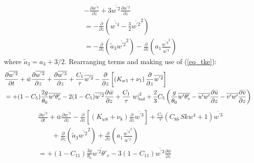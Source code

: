 \documentclass[11pt,fleqn]{article}
\newcommand{\ptlder}[2]{\frac{\partial #1}{\partial #2}}
\begin{document}
%
\begin{equation}
\begin{split}
& - \ptlder{\overline{w^{'4}}}{z} 
  + 3\overline{w^{'2}}\ptlder{\overline{w^{'2}}}{z} \\
& = - \ptlder{}{z}
         \left( \overline{w^{'4}} -\frac{3}{2}\overline{w^{'2}}^2 \right) \\
& = - \ptlder{}{z} 
      \left( \tilde{a}_3 \overline{w^{'2}}^2 \right)
    - \ptlder{}{z} 
      \left( a_1 \frac{ \overline{w^{'3}}^2 }{ \overline{w^{'2}} } \right)
\end{split}
\end{equation}
%
where $\tilde{a}_3 = a_3 +3/2$.  Rearranging terms and making use of (\ref{eq_tke}):
%
\begin{equation}
\label{eq_wp2c}
\begin{split}
& \ptlder{\overline{w^{'2}}}{t} 
  + \bar{w}\ptlder{\overline{w^{'2}}}{z}	 
  + \ptlder{\overline{w^{'3}}}{z} 
  + \dfrac{C_1}{\tau} \overline{w^{'2}} 
  - \ptlder{}{z} \left[ \left( K_{w1} + \nu_1 \right)
                        \ptlder{}{z} \overline{w^{'2}} 
                 \right]  \\
& =
  + ( 1 - C_5 ) \frac{2g}{\theta_0} \overline{w'\theta'_v}
  - 2 ( 1 - C_5 ) \overline{w^{'2}}\ptlder{\bar{w}}{z}
  + \dfrac{C_1}{\tau} \left. w \right|_{\rm{tol}}^{2}
  + \frac{2}{3} C_5
     \left(
       \frac{g}{\theta_0} \overline{w'\theta'_v} 
       - \overline{u'w'}\ptlder{\bar{u}}{z} 
       - \overline{v'w'}\ptlder{\bar{v}}{z} 
     \right) \\
\end{split}
\end{equation}
%
\begin{equation}
\label{eq_wp3c}
\begin{split}
& \ptlder{\overline{w^{'3}}}{t}
   + \bar{w}\ptlder{\overline{w^{'3}}}{z}
   - \ptlder{}{z} \left[ \left( K_{w8} + \nu_8 \right)
                         \ptlder{}{z} \overline{w^{'3}} 
                  \right]
  + \frac{C_8}{\tau}\left( C_{8b} \, Skw^4 + 1 \right) \overline{w^{'3}} \\
& \qquad 
  + \ptlder{}{z} \left( \tilde{a}_3 \overline{w^{'2}}^2 \right)
  + \ptlder{}{z} 
       \left(
          a_1 \frac{ \overline{w^{'3}}^2 }{ \overline{w^{'2}} }
       \right) \\
& = 
  + (1 - C_{11}) \frac{3g}{\theta_0} \overline{w^{'2}\theta'_v}
  - 3 ( 1 - C_{11} ) \overline{w^{'3}}\ptlder{\bar{w}}{z} \\
\end{split}
\end{equation}
%
\end{document}
